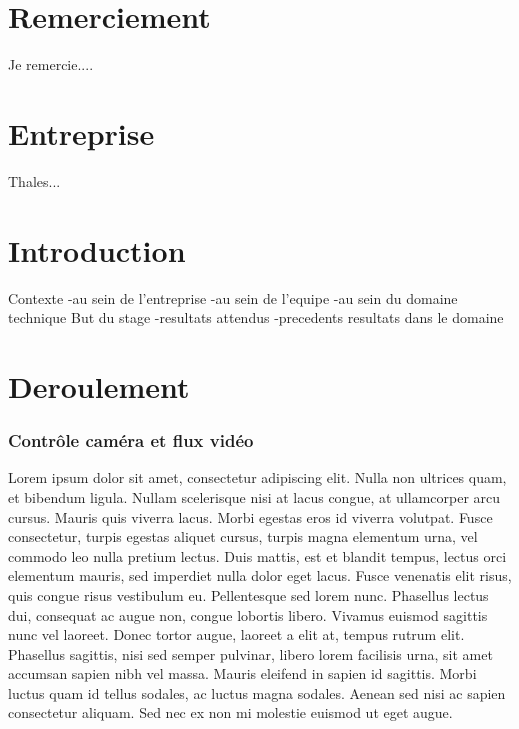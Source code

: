 \documentclass[11pt]{article}
\begin{document}
\part*{Remerciement}
Je remercie....
\pagebreak
\part*{Entreprise}
Thales...
\pagebreak
\part*{Introduction}
Contexte
-au sein de l'entreprise
-au sein de l'equipe
-au sein du domaine technique
But du stage
-resultats attendus
-precedents resultats dans le domaine
\pagebreak
\part*{Deroulement}
\section{Contrôle caméra et flux vidéo}


Lorem ipsum dolor sit amet, consectetur adipiscing elit. Nulla non ultrices quam, et bibendum ligula. Nullam scelerisque nisi at lacus congue, at ullamcorper arcu cursus. Mauris quis viverra lacus. Morbi egestas eros id viverra volutpat. Fusce consectetur, turpis egestas aliquet cursus, turpis magna elementum urna, vel commodo leo nulla pretium lectus. Duis mattis, est et blandit tempus, lectus orci elementum mauris, sed imperdiet nulla dolor eget lacus. Fusce venenatis elit risus, quis congue risus vestibulum eu. Pellentesque sed lorem nunc. Phasellus lectus dui, consequat ac augue non, congue lobortis libero. Vivamus euismod sagittis nunc vel laoreet. Donec tortor augue, laoreet a elit at, tempus rutrum elit. Phasellus sagittis, nisi sed semper pulvinar, libero lorem facilisis urna, sit amet accumsan sapien nibh vel massa. Mauris eleifend in sapien id sagittis. Morbi luctus quam id tellus sodales, ac luctus magna sodales. Aenean sed nisi ac sapien consectetur aliquam. Sed nec ex non mi molestie euismod ut eget augue.
\end{document}
